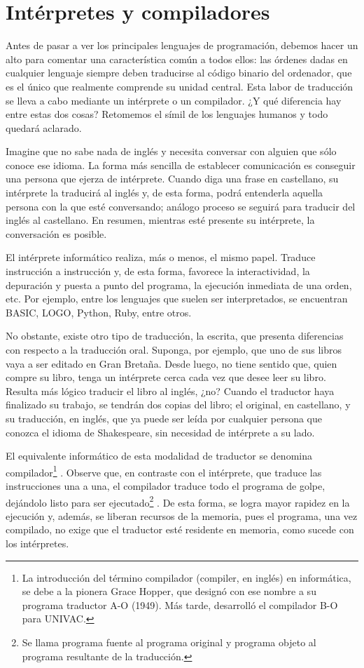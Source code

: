 \documentclass[twoside,twocolumn]{article}
\begin{document}
\section{Intérpretes y compiladores}

Antes de pasar a ver los principales lenguajes de
programación, debemos hacer un alto para comentar
una característica común a todos ellos: las órdenes
dadas en cualquier lenguaje siempre deben traducirse
al código binario del ordenador, que es el único que
realmente comprende su unidad central. Esta labor de
traducción se lleva a cabo mediante un intérprete o un
compilador. ¿Y qué diferencia hay entre estas dos
cosas? Retomemos el símil de los lenguajes humanos y
todo quedará aclarado.

Imagine que no sabe nada de inglés y necesita conversar con alguien que sólo conoce ese idioma. La
forma más sencilla de establecer comunicación es conseguir una persona que ejerza de intérprete. Cuando
diga una frase en castellano, su intérprete la traducirá
al inglés y, de esta forma, podrá entenderla aquella
persona con la que esté conversando; análogo proceso
se seguirá para traducir del inglés al castellano. En
resumen, mientras esté presente su intérprete, la conversación es posible.

El intérprete informático realiza, más o menos, el
mismo papel. Traduce instrucción a instrucción y, de
esta forma, favorece la interactividad, la depuración y
puesta a punto del programa, la ejecución inmediata
de una orden, etc. Por ejemplo, entre los lenguajes que
suelen ser interpretados, se encuentran BASIC, LOGO, Python, Ruby, entre otros.

No obstante, existe otro tipo de traducción, la escrita, que presenta diferencias con respecto a la traducción oral. Suponga, por ejemplo, que uno de sus libros
vaya a ser editado en Gran Bretaña. Desde luego, no
tiene sentido que, quien compre su libro, tenga un
intérprete cerca cada vez que desee leer su libro. Resulta más lógico traducir el libro al inglés, ¿no? Cuando el
traductor haya finalizado su trabajo, se tendrán dos
copias del libro; el original, en castellano, y su traducción, en inglés, que ya puede ser leída por cualquier
persona que conozca el idioma de Shakespeare, sin
necesidad de intérprete a su lado.

El equivalente informático de esta modalidad de
traductor se denomina compilador\footnote{La introducción del término compilador (compiler, en inglés) en informática, se debe a la pionera Grace Hopper, que designó con ese nombre a su programa traductor A-O (1949). Más tarde, desarrolló el compilador B-O para UNIVAC.} . Observe que, en
contraste con el intérprete, que traduce las instrucciones una a una, el compilador traduce todo el programa
de golpe, dejándolo listo para ser ejecutado\footnote{Se llama programa fuente al programa original y programa objeto al programa resultante de la traducción.} . De esta
forma, se logra mayor rapidez en la ejecución y, además, se liberan recursos de la memoria, pues el programa, una vez compilado, no exige que el traductor esté
residente en memoria, como sucede con los intérpretes.
\end{document}
